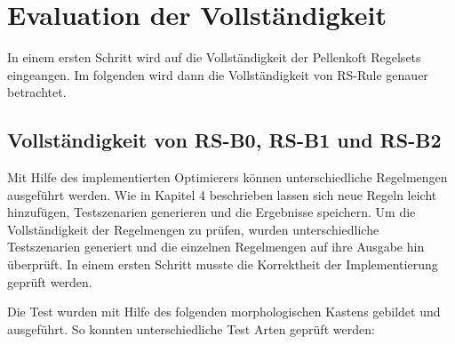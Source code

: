 \section{Evaluation der Vollständigkeit}

In einem ersten Schritt wird auf die Vollständigkeit der Pellenkoft Regelsets eingeangen. Im folgenden wird dann die Vollständigkeit von RS-Rule genauer betrachtet.

\subsection{Vollständigkeit von RS-B0, RS-B1 und RS-B2}

Mit Hilfe des implementierten Optimierers können unterschiedliche Regelmengen ausgeführt werden. Wie in Kapitel 4 beschrieben lassen sich neue Regeln leicht hinzufügen, Testszenarien generieren und die Ergebnisse speichern. Um die Vollständigkeit der Regelmengen zu prüfen, wurden unterschiedliche Testszenarien generiert und die einzelnen Regelmengen auf ihre Ausgabe hin überprüft. In einem ersten Schritt musste die Korrektheit der Implementierung geprüft werden.

Die Test wurden mit Hilfe des folgenden morphologischen Kastens gebildet und ausgeführt. So konnten unterschiedliche Test Arten geprüft werden:

\begin{table}[h]
\centering
{}
\caption{Morthologischer Kasten zur Test Generierung}
\label{my-label}
\end{table}

